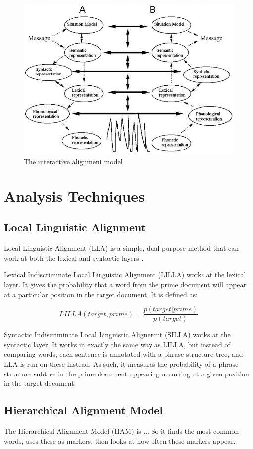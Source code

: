 \documentclass[conference]{IEEEtran}
\begin{document}
\begin{figure}
	\caption{The interactive alignment model}
	\includegraphics[width=\textwidth]{iam}
\end{figure}


\section{Analysis Techniques}

\subsection{Local Linguistic Alignment}
Local Linguistic Alignment (LLA) is a simple,  dual purpose method that can work at both the lexical
and syntactic layers \cite{wang2014linguistic, xu2015evaluation}.

Lexical Indiscriminate Local Linguistic Alignment (LILLA) works at the lexical layer. It gives the
probability that a word from the prime document will appear at a particular position in the target 
document. It is defined as:

\[LILLA(target, prime) = \frac{p(target|prime)}{p(target)}\]

Syntactic Indiscriminate Local Linguistic Alignemnt (SILLA) works at the syntactic layer. It works
in exactly the same way as LILLA, but instead of comparing words, each sentence is annotated with a
phrase structure tree, and LLA is run on these instead. As such, it measures the probability of a
phrase structure subtree in the prime document appearing occurring at a given position in the target
document. 


\subsection{Hierarchical Alignment Model}
The Hierarchical Alignment Model (HAM) \cite{doyle2016robust} is ...
So it finds the most common words, uses these as markers, then looks at how often these markers
appear.
\end{document}
